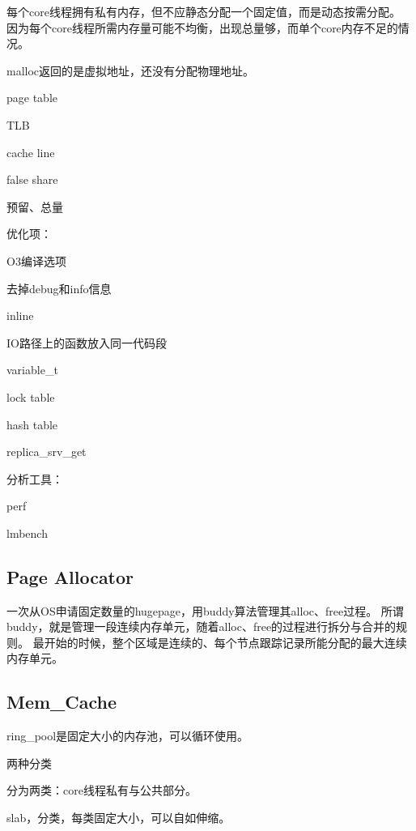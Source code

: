 每个core线程拥有私有内存，但不应静态分配一个固定值，而是动态按需分配。
因为每个core线程所需内存量可能不均衡，出现总量够，而单个core内存不足的情况。

malloc返回的是虚拟地址，还没有分配物理地址。

\begin{enumbox}
\item page table
\item TLB
\item cache line
\item false share
\end{enumbox}

预留、总量

优化项：
\begin{enumbox}
\item O3编译选项
\item 去掉debug和info信息
\item inline
\item IO路径上的函数放入同一代码段
\item variable\_t
\item lock table
\item hash table
\item replica\_srv\_get
\end{enumbox}

分析工具：
\begin{enumbox}
\item perf
\item lmbench
\end{enumbox}

\subsection{Page Allocator}

一次从OS申请固定数量的hugepage，用buddy算法管理其alloc、free过程。
所谓buddy，就是管理一段连续内存单元，随着alloc、free的过程进行拆分与合并的规则。
最开始的时候，整个区域是连续的、每个节点跟踪记录所能分配的最大连续内存单元。

\subsection{Mem\_Cache}

ring\_pool是固定大小的内存池，可以循环使用。

两种分类
\begin{enumbox}
\item 分为两类：core线程私有与公共部分。
\item slab，分类，每类固定大小，可以自如伸缩。
\end{enumbox}

